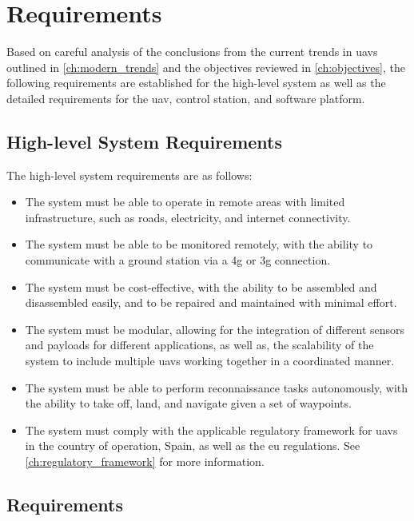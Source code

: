 \chapter{Requirements}

Based on careful analysis of the conclusions from the current trends in \glspl{uav} outlined in \cref{ch:modern_trends} and the objectives reviewed in \cref{ch:objectives}, the following requirements are established for the high-level system as well as the detailed requirements for the \gls{uav}, control station, and software platform.

\section{High-level System Requirements}

The high-level system requirements are as follows:

\begin{itemize}
  \item The system must be able to operate in remote areas with limited infrastructure, such as roads, electricity, and internet connectivity.

  \item The system must be able to be monitored remotely, with the ability to communicate with a ground station via a \gls{4g} or \gls{3g} connection.

  \item The system must be cost-effective, with the ability to be assembled and disassembled easily, and to be repaired and maintained with minimal effort.

  \item The system must be modular, allowing for the integration of different sensors and payloads for different applications, as well as, the scalability of the system to include multiple \glspl{uav} working together in a coordinated manner.

  \item The system must be able to perform reconnaissance tasks autonomously, with the ability to take off, land, and navigate given a set of waypoints.

  \item The system must comply with the applicable regulatory framework for \glspl{uav} in the country of operation, Spain, as well as the \gls{eu} regulations. See \cref{ch:regulatory_framework} for more information.
\end{itemize}

\section{ Requirements}

